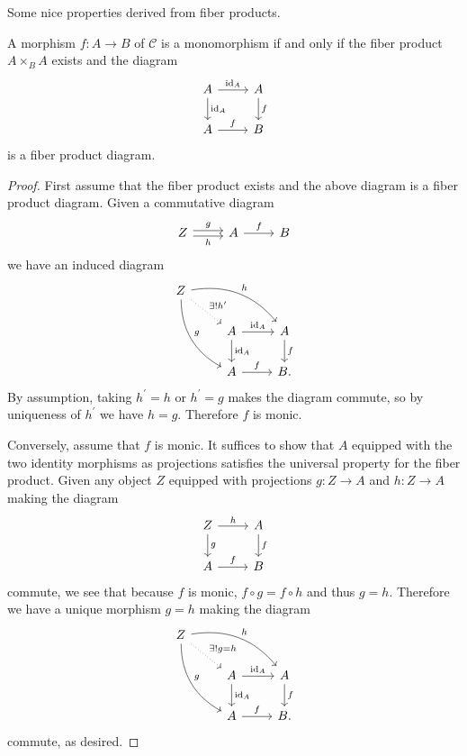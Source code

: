 \documentclass[dissertation.tex]{subfiles}
\begin{document}
Some nice properties derived from fiber products.

\begin{prop}\label{p.5}
  A morphism $f : A \rightarrow B$ of $\mathscr{C}$ is a monomorphism if and only if the fiber product $A \times_B A$ exists and the diagram
  $$\begin{tikzcd}
    A \arrow{d}{\op{id}_A}\arrow{r}{\op{id}_A} & A\arrow{d}{f}\\
    A\arrow{r}{f} & B
  \end{tikzcd}$$
  is a fiber product diagram.

  \begin{proof}
    First assume that the fiber product exists and the above diagram is a fiber product diagram.
    Given a commutative diagram
    $$\begin{tikzcd}
      Z \arrow[yshift=0.5ex]{r}{g} \arrow[yshift=-0.5ex,swap]{r}{h}& A \arrow{r}{f}& B
    \end{tikzcd}$$
    we have an induced diagram
    $$\begin{tikzcd}
      Z \arrow[bend right]{ddr}{g} \arrow[bend left]{rrd}{h} \arrow[dotted]{rd}{\exists !h^\prime}\\
      & A\arrow{d}{\op{id}_A}\arrow{r}{\op{id}_A} & A\arrow{d}{f}\\
      & A\arrow{r}{f} & B.
    \end{tikzcd}$$
    By assumption, taking $h^\prime = h$ or $h^\prime = g$ makes the diagram commute, so by uniqueness of $h^\prime$ we have $h = g$.
    Therefore $f$ is monic.

    Conversely, assume that $f$ is monic.
    It suffices to show that $A$ equipped with the two identity morphisms as projections satisfies the universal property for the fiber product.
    Given any object $Z$ equipped with projections $g : Z \rightarrow A$ and $h : Z \rightarrow A$ making the diagram
    $$\begin{tikzcd}
      Z \arrow{d}{g} \arrow{r}{h} & A\arrow{d}{f}\\
      A\arrow{r}{f} & B
    \end{tikzcd}$$
    commute, we see that because $f$ is monic,
    $f \circ g = f \circ h$
    and thus $g = h$.
    Therefore we have a unique morphism $g = h$ making the diagram
    $$\begin{tikzcd}
      Z \arrow[bend right]{ddr}{g} \arrow[bend left]{rrd}{h} \arrow[dotted]{rd}{\exists !g = h}\\
      & A\arrow{d}{\op{id}_A}\arrow{r}{\op{id}_A} & A\arrow{d}{f}\\
      & A\arrow{r}{f} & B.
    \end{tikzcd}$$
    commute, as desired.
  \end{proof}
\end{prop}
\end{document}
